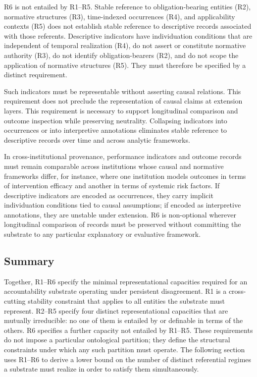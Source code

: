 R6 is not entailed by R1--R5.
Stable reference to obligation-bearing entities (R2),
normative structures (R3),
time-indexed occurrences (R4),
and applicability contexts (R5)
does not establish stable reference to descriptive records associated with those referents.
Descriptive indicators have individuation conditions that are
independent of temporal realization (R4),
do not assert or constitute normative authority (R3),
do not identify obligation-bearers (R2),
and do not scope the application of normative structures (R5).
They must therefore be specified by a distinct requirement.

Such indicators must be representable without asserting causal relations.
This requirement does not preclude the representation of causal claims
at extension layers.
This requirement is necessary to support longitudinal comparison and outcome
inspection while preserving neutrality.
Collapsing indicators into occurrences or into interpretive annotations
eliminates stable reference to descriptive records
over time and across analytic frameworks.

In cross-institutional provenance, performance indicators and outcome
records must remain comparable across
institutions whose causal and normative frameworks differ,
for instance, where one institution models outcomes
in terms of intervention efficacy and another in terms of systemic risk factors.
If descriptive indicators are encoded as occurrences, they carry implicit
individuation conditions tied to causal assumptions; if encoded as
interpretive annotations, they are unstable under extension.
R6 is non-optional wherever longitudinal comparison of records must be
preserved without committing the substrate to any particular explanatory
or evaluative framework.

\subsection{Summary}

Together, R1--R6 specify the minimal representational capacities required for
an accountability substrate operating under persistent disagreement.
R1 is a cross-cutting stability constraint that applies to all
entities the substrate must represent.
R2--R5 specify four distinct representational capacities
that are mutually irreducible:
no one of them is entailed by or definable in terms of the others.
R6 specifies a further capacity not entailed by R1--R5.
These requirements do not impose a particular ontological partition;
they define the structural constraints under which any such partition must operate.
The following section uses R1--R6 to derive a lower bound
on the number of distinct referential regimes a substrate
must realize in order to satisfy them simultaneously.
